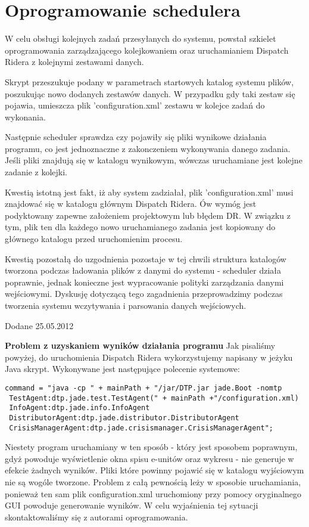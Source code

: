 \lstset{language=Java}
\chapter{Oprogramowanie schedulera}
W celu obsługi kolejnych zadań przesyłanych do systemu, powstał szkielet oprogramowania zarządzającego kolejkowaniem oraz uruchamianiem Dispatch Ridera z kolejnymi zestawami danych.


Skrypt przeszukuje podany w parametrach startowych katalog systemu plików, poszukując nowo dodanych zestawów danych. W przypadku gdy taki zestaw się pojawia, umieszcza plik 'configuration.xml' zestawu w kolejce zadań do wykonania.


Następnie scheduler sprawdza czy pojawiły się pliki wynikowe działania programu, co jest jednoznaczne z zakonczeniem wykonywania danego zadania. Jeśli pliki znajdują się w katalogu wynikowym, wówczas uruchamiane jest kolejne zadanie z kolejki. 


Kwestią istotną jest fakt, iż aby system zadziałał, plik 'configuration.xml' musi znajdować się w katalogu głównym Dispatch Ridera. Ów wymóg jest podyktowany zapewne założeniem projektowym lub błędem DR. W związku z tym, plik ten dla każdego nowo uruchamianego zadania jest kopiowany do głównego katalogu przed uruchomienim procesu. 


Kwestią pozostałą do uzgodnienia pozostaje w tej chwili struktura katalogów tworzona podczas ładowania plików z danymi do systemu - scheduler działa poprawnie, jednak konieczne jest wypracowanie polityki zarządzania danymi wejściowymi. Dyskusję dotyczącą tego zagadnienia przeprowadzimy podczas tworzenia systemu wczytywania i parsowania danych wejściowych.


Dodane 25.05.2012

\textbf{Problem z uzyskaniem wyników działania programu}
Jak pisaliśmy powyżej, do uruchomienia Dispatch Ridera wykorzystujemy napisany w jeżyku Java skrypt. Wykonywane jest następujące polecenie systemowe:

\begin{lstlisting}
command = "java -cp " + mainPath + "/jar/DTP.jar jade.Boot -nomtp
 TestAgent:dtp.jade.test.TestAgent(" + mainPath +"/configuration.xml)
 InfoAgent:dtp.jade.info.InfoAgent
 DistributorAgent:dtp.jade.distributor.DistributorAgent
 CrisisManagerAgent:dtp.jade.crisismanager.CrisisManagerAgent";
\end{lstlisting}

Niestety program uruchamiany w ten sposób - który jest sposobem poprawnym, gdyż powoduje wyświetlenie okna spisu e-unitów oraz wykresu - nie generuje w efekcie żadnych wyników. Pliki które powinny pojawić się w katalogu wyjściowym nie są wogóle tworzone. Problem z całą pewnością leży w sposobie uruchamiania, ponieważ ten sam plik configuration.xml uruchomiony przy pomocy oryginalnego GUI powoduje generowanie wyników. W celu wyjaśnienia tej sytuacji skontaktowaliśmy się z autorami oprogramowania.